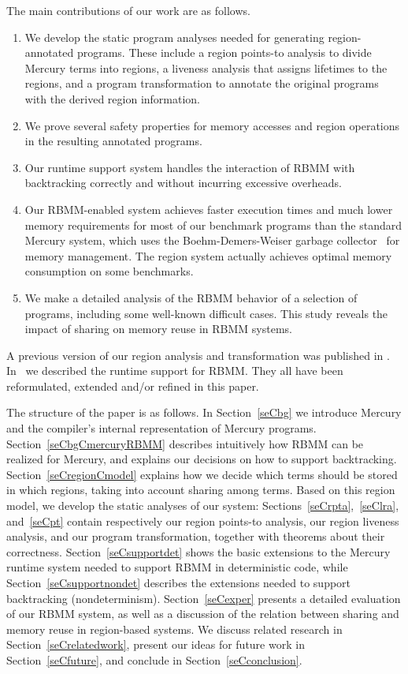 \documentclass{tlp}
\begin{document}
The main contributions of our work are as follows.
\begin{enumerate}
\item
We develop the static program analyses needed
for generating region-annotated programs.
These include a region points-to analysis to divide Mercury terms into regions,
a liveness analysis that assigns lifetimes to the regions,
and a program transformation to annotate the
original programs with the derived region information.
\item
We prove several safety properties
for memory accesses and region operations in the resulting annotated programs.
\item
Our runtime support system
handles the interaction of RBMM with backtracking
correctly and without incurring excessive overheads.
\item
Our RBMM-enabled system achieves faster execution times
and much lower memory requirements
for most of our benchmark programs
than the standard Mercury system, which uses
the Boehm-Demers-Weiser garbage collector~\cite{Boehm88} for memory management.
The region system actually achieves
optimal memory consumption on some benchmarks.
\item
We make a detailed analysis of the RBMM behavior
of a selection of programs, including some well-known difficult cases.
This study reveals the impact of sharing on memory reuse in RBMM systems.
\end{enumerate}

A previous version of our region analysis and transformation
was published in \cite{Phan07iclp}.
In~\cite{Phan08ismm} we described the runtime support for RBMM.
They all have been reformulated, extended and/or refined in this paper.

The structure of the paper is as follows.
In Section~\ref{seCbg} we introduce Mercury
and the compiler's internal representation of Mercury programs.
Section~\ref{seCbgCmercuryRBMM} describes intuitively
how RBMM can be realized for Mercury,
and explains our decisions on how to support backtracking.
Section~\ref{seCregionCmodel} explains how we decide
which terms should be stored in which regions,
taking into account sharing among terms.
Based on this region model, we develop the static analyses of our system:
Sections~\ref{seCrpta},~\ref{seClra}, and~\ref{seCpt} contain respectively
our region points-to analysis, our region liveness analysis,
and our program transformation,
together with theorems about their correctness.
Section~\ref{seCsupportdet} shows
the basic extensions to the Mercury runtime system
needed to support RBMM in deterministic code,
while Section~\ref{seCsupportnondet}
describes the extensions needed to support backtracking (nondeterminism).
Section~\ref{seCexper} presents a detailed evaluation of our RBMM system,
as well as a discussion of the relation
between sharing and memory reuse in region-based systems.
We discuss related research in Section~\ref{seCrelatedwork},
present our ideas for future work in Section~\ref{seCfuture},
and conclude in Section~\ref{seCconclusion}.
\end{document}
